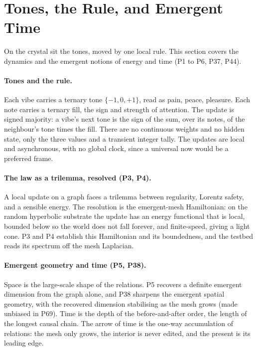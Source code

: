\section{Tones, the Rule, and Emergent Time}
\label{sec:dynamics}

On the crystal sit the tones, moved by one local rule. This section covers the dynamics and the
emergent notions of energy and time (P1 to P6, P37, P44).

\paragraph{Tones and the rule.}
Each vibe carries a ternary tone $\{-1, 0, +1\}$, read as pain, peace, pleasure. Each note carries
a ternary fill, the sign and strength of attention. The update is signed majority: a vibe's next
tone is the sign of the sum, over its notes, of the neighbour's tone times the fill. There are no
continuous weights and no hidden state, only the three values and a transient integer tally. The
updates are local and asynchronous, with no global clock, since a universal now would be a preferred
frame.

\paragraph{The law as a trilemma, resolved (P3, P4).}
A local update on a graph faces a trilemma between regularity, Lorentz safety, and a sensible
energy. The resolution is the emergent-mesh Hamiltonian: on the random hyperbolic substrate the
update has an energy functional that is local, bounded below so the world does not fall forever, and
finite-speed, giving a light cone. P3 and P4 establish this Hamiltonian and its boundedness, and the
testbed reads its spectrum off the mesh Laplacian.

\paragraph{Emergent geometry and time (P5, P38).}
Space is the large-scale shape of the relations. P5 recovers a definite emergent dimension from the
graph alone, and P38 sharpens the emergent spatial geometry, with the recovered dimension stabilising
as the mesh grows (made unbiased in P69). Time is the depth of the before-and-after order, the length
of the longest causal chain. The arrow of time is the one-way accumulation of relations: the mesh
only grows, the interior is never edited, and the present is its leading edge.

